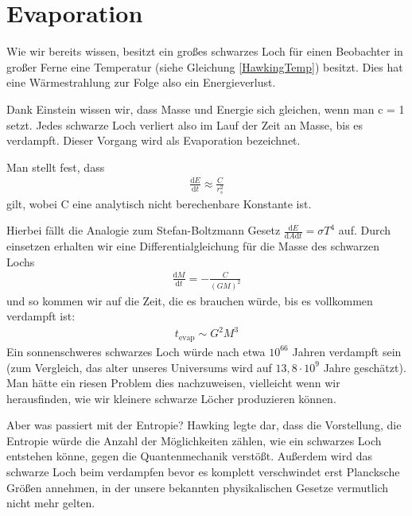 \documentclass[ngerman]{scrartcl}
\newcommand{\diff}{\mathrm{d}}
\begin{document}
\FloatBarrier
\section{Evaporation} \label{evaporation}

Wie wir bereits wissen, besitzt ein großes schwarzes Loch für einen Beobachter in großer Ferne eine Temperatur (siehe Gleichung \eqref{HawkingTemp}) besitzt. Dies hat eine Wärmestrahlung zur Folge also ein Energieverlust.

Dank Einstein wissen wir, dass Masse und Energie sich gleichen, wenn man c = 1 setzt. Jedes schwarze Loch verliert also im Lauf der Zeit an Masse, bis es verdampft. Dieser Vorgang wird als Evaporation bezeichnet. 

Man stellt fest, dass
	\begin{align}
		\frac{\diff E}{\diff t} \approx \frac{C}{r_s^2}
	\end{align}
gilt, wobei C eine analytisch nicht berechenbare Konstante ist.

Hierbei fällt die Analogie zum Stefan-Boltzmann Gesetz $\frac{\diff E}{\diff A \diff t} = \sigma T^4$ auf. 
Durch einsetzen erhalten wir eine Differentialgleichung für die Masse des schwarzen Lochs
	\begin{align}
		\frac{\diff M}{\diff t} = - \frac{C}{(GM)^2}
	\end{align}	
und so kommen wir auf die Zeit, die es brauchen würde, bis es vollkommen verdampft ist:
	\begin{align}
		t_{\text{evap}} \sim G^2 M^3
	\end{align} 
Ein sonnenschweres schwarzes Loch würde nach etwa $10^{66}$ Jahren verdampft sein (zum Vergleich, das alter unseres Universums wird auf $13,8 \cdot 10^{9}$ Jahre geschätzt). Man hätte ein riesen Problem dies nachzuweisen, vielleicht wenn wir herausfinden, wie wir kleinere schwarze Löcher produzieren können. 

Aber was passiert mit der Entropie?
Hawking \cite{BreakdownGravitationalCollapse} legte dar, dass die Vorstellung, die Entropie würde die Anzahl der Möglichkeiten zählen, wie ein schwarzes Loch entstehen könne, gegen die Quantenmechanik verstößt.
Außerdem wird das schwarze Loch beim verdampfen bevor es komplett verschwindet erst Plancksche Größen annehmen, in der unsere bekannten physikalischen Gesetze vermutlich nicht mehr gelten. 
\end{document}
